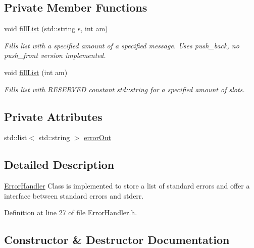 \subsection*{Private Member Functions}
\begin{DoxyCompactItemize}
\item 
void \mbox{\hyperlink{classErrorHandler_a3036b8ff4299ac0505b6b2ca6fab11a1}{fill\+List}} (std\+::string s, int am)
\begin{DoxyCompactList}\small\item\em Fills list with a specified amount of a specified message. Uses push\+\_\+back, no push\+\_\+front version implemented. \end{DoxyCompactList}\item 
void \mbox{\hyperlink{classErrorHandler_a4edd505cdb0ae60da6f9e26b0fb90f68}{fill\+List}} (int am)
\begin{DoxyCompactList}\small\item\em Fills list with R\+E\+S\+E\+R\+V\+ED constant std\+::string for a specified amount of slots. \end{DoxyCompactList}\end{DoxyCompactItemize}
\subsection*{Private Attributes}
\begin{DoxyCompactItemize}
\item 
std\+::list$<$ std\+::string $>$ \mbox{\hyperlink{classErrorHandler_aeb3bff116fcb83a58defbef8e8111f0e}{error\+Out}}
\end{DoxyCompactItemize}


\subsection{Detailed Description}
\mbox{\hyperlink{classErrorHandler}{Error\+Handler}} Class is implemented to store a list of standard errors and offer a interface between standard errors and stderr. 

Definition at line 27 of file Error\+Handler.\+h.



\subsection{Constructor \& Destructor Documentation}
\mbox{\label{classErrorHandler_a7e5f379bd231442b898cef94556b2107}} 
